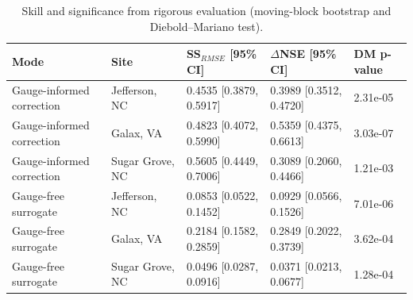 \begin{table}
\centering
\caption{Skill and significance from rigorous evaluation (moving-block bootstrap and Diebold--Mariano test).}
\small
\begin{tabular}{ll l l l}
\toprule
\textbf{Mode} & \textbf{Site} & \textbf{SS$_{RMSE}$ [95\% CI]} & \textbf{$\Delta$NSE [95\% CI]} & \textbf{DM p-value} \\
\midrule
Gauge-informed correction & Jefferson, NC & 0.4535 [0.3879, 0.5917] & 0.3989 [0.3512, 0.4720] & 2.31e-05 \\
Gauge-informed correction & Galax, VA & 0.4823 [0.4072, 0.5990] & 0.5359 [0.4375, 0.6613] & 3.03e-07 \\
Gauge-informed correction & Sugar Grove, NC & 0.5605 [0.4449, 0.7006] & 0.3089 [0.2060, 0.4466] & 1.21e-03 \\
Gauge-free surrogate & Jefferson, NC & 0.0853 [0.0522, 0.1452] & 0.0929 [0.0566, 0.1526] & 7.01e-06 \\
Gauge-free surrogate & Galax, VA & 0.2184 [0.1582, 0.2859] & 0.2849 [0.2022, 0.3739] & 3.62e-04 \\
Gauge-free surrogate & Sugar Grove, NC & 0.0496 [0.0287, 0.0916] & 0.0371 [0.0213, 0.0677] & 1.28e-04 \\
\bottomrule
\end{tabular}
\label{tab:significance}
\end{table}
